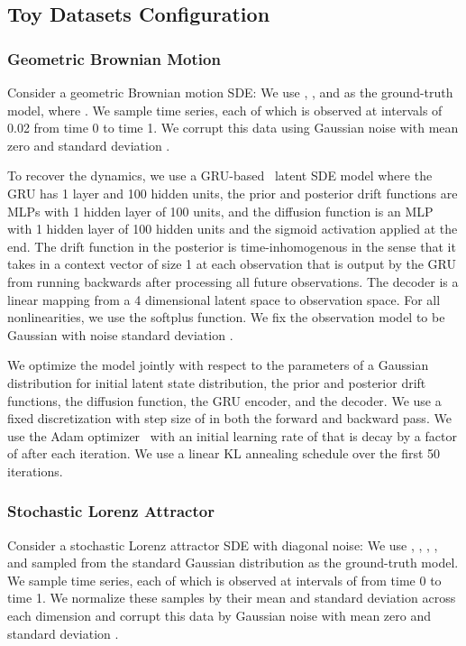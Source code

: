 \documentclass[twoside]{article}
\begin{document}
 \subsection{Toy Datasets Configuration}\label{app:toy_datasets}
\subsubsection{Geometric Brownian Motion}
Consider a geometric Brownian motion SDE:
We use , , and  as the ground-truth model, where . We sample  time series, each of which is observed at intervals of 0.02 from time 0 to time 1. We corrupt this data using Gaussian noise with mean zero and standard deviation .

To recover the dynamics, we use a GRU-based~\cite{cho2014learning} latent SDE model where the GRU has 1 layer and 100 hidden units, the prior and posterior drift functions are MLPs with 1 hidden layer of 100 units, and the diffusion function is an MLP with 1 hidden layer of 100 hidden units and the sigmoid activation applied at the end. 
The drift function in the posterior is time-inhomogenous in the sense that it takes in a context vector of size 1 at each observation that is output by the GRU from running backwards after processing all future observations.
The decoder is a linear mapping from a 4 dimensional latent space to observation space. 
For all nonlinearities, we use the softplus function.
We fix the observation model to be Gaussian with noise standard deviation .

We optimize the model jointly with respect to the parameters of a Gaussian distribution for initial latent state distribution, the prior and posterior drift functions, the diffusion function, the GRU encoder, and the decoder. 
We use a fixed discretization with step size of  in both the forward and backward pass.
We use the Adam optimizer~\cite{kingma2014adam} with an initial learning rate of  that is decay by a factor of  after each iteration.
We use a linear KL annealing schedule over the first 50 iterations. 

\subsubsection{Stochastic Lorenz Attractor}
Consider a stochastic Lorenz attractor SDE with diagonal noise:
We use , , , , and  sampled from the standard Gaussian distribution as the ground-truth model. We sample  time series, each of which is observed at intervals of  from time 0 to time 1. We normalize these samples by their mean and standard deviation across each dimension and corrupt this data by Gaussian noise with mean zero and standard deviation .
\end{document}
